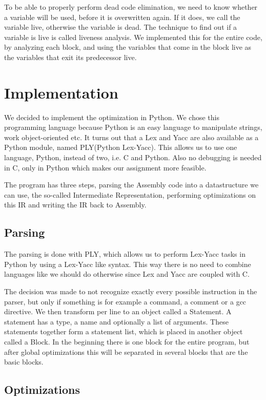 \documentclass[10pt,a4paper]{article}
\begin{document}
To be able to properly perform dead code elimination, we need to know whether a
variable will be used, before it is overwritten again. If it does, we call the
variable live, otherwise the variable is dead. The technique to find out if a
variable is live is called liveness analysis. We implemented this for the
entire code, by analyzing each block, and using the variables that come in the
block live as the variables that exit its predecessor live.

\section{Implementation}

We decided to implement the optimization in Python. We chose this programming
language because Python is an easy language to manipulate strings, work
object-oriented etc.
It turns out that a Lex and Yacc are also available as a Python module,
named PLY(Python Lex-Yacc). This allows us to use one language, Python, instead
of two, i.e. C and Python. Also no debugging is needed in C, only in Python
which makes our assignment more feasible.

The program has three steps, parsing the Assembly code into a datastructure we
can use, the so-called Intermediate Representation, performing optimizations on
this IR and writing the IR back to Assembly.

\subsection{Parsing}

The parsing is done with PLY, which allows us to perform Lex-Yacc tasks in
Python by using a Lex-Yacc like syntax. This way there is no need to combine
languages like we should do otherwise since Lex and Yacc are coupled with C.

The decision was made to not recognize exactly every possible instruction in
the parser, but only if something is for example a command, a comment or a gcc
directive. We then transform per line to an object called a Statement. A
statement has a type, a name and optionally a list of arguments. These
statements together form a statement list, which is placed in another object
called a Block. In the beginning there is one block for the entire program, but
after global optimizations this will be separated in several blocks that are
the basic blocks.

\subsection{Optimizations}
\end{document}

